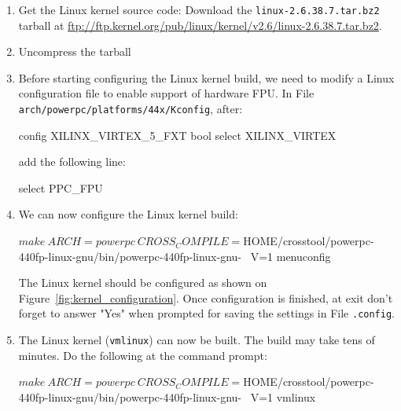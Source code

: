 \begin{enumerate}
\item Get the Linux kernel source code: Download the \texttt{linux-2.6.38.7.tar.bz2} tarball at \url{ftp://ftp.kernel.org/pub/linux/kernel/v2.6/linux-2.6.38.7.tar.bz2}.
\item Uncompress the tarball
\item Before starting configuring the Linux kernel build, we need to modify a Linux configuration file to enable support of hardware FPU.
In File \texttt{arch/powerpc/platforms/44x/Kconfig}, after:
\begin{script}
 config XILINX_VIRTEX_5_FXT
        bool
        select XILINX_VIRTEX
\end{script}
\noindent add the following line:
\begin{script}
        select PPC_FPU
\end{script}
\item We can now configure the Linux kernel build:
\begin{script}
$ make \
    ARCH=powerpc \
    CROSS_COMPILE=${HOME}/crosstool/powerpc-440fp-linux-gnu/bin/powerpc-440fp-linux-gnu- \
    V=1 menuconfig
\end{script}
The Linux kernel should be configured as shown on Figure~\ref{fig:kernel_configuration}.
Once configuration is finished, at exit don't forget to answer "Yes" when prompted for saving the settings in File \texttt{.config}.
\item The Linux kernel (\texttt{vmlinux}) can now be built.
The build may take tens of minutes.
Do the following at the command prompt:
\begin{script}
$ make \
    ARCH=powerpc \
    CROSS_COMPILE=${HOME}/crosstool/powerpc-440fp-linux-gnu/bin/powerpc-440fp-linux-gnu- \
    V=1 vmlinux
\end{script}
\end{enumerate}


